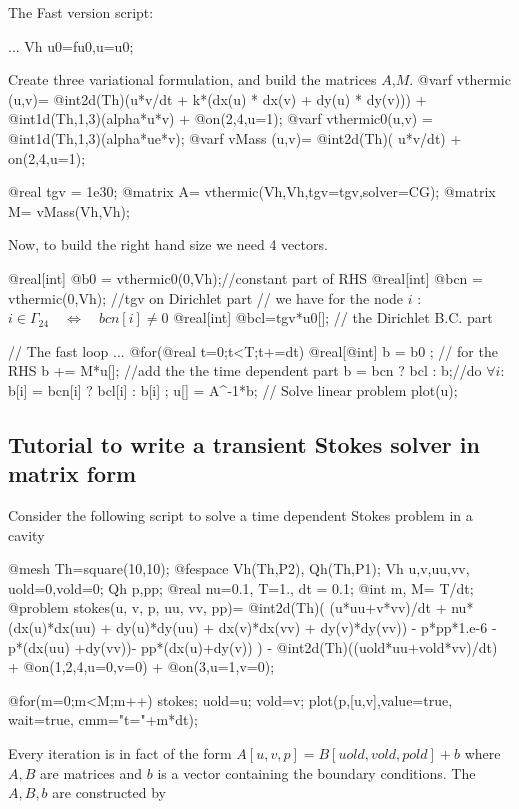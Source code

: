 \documentclass[a4paper,twoside,12pt]{book}
\begin{document}
The Fast version script:

\bFF
 ...
Vh u0=fu0,u=u0; 
\eFF

Create three variational formulation, and build the matrices $A$,$M$.\label{matrix-varf}
\bFF
@varf vthermic (u,v)= @int2d(Th)(u*v/dt 
           + k*(dx(u) * dx(v) + dy(u) * dy(v)))  
  +  @int1d(Th,1,3)(alpha*u*v)  + @on(2,4,u=1); 
@varf vthermic0(u,v) =   @int1d(Th,1,3)(alpha*ue*v);
@varf vMass (u,v)= @int2d(Th)( u*v/dt)  + on(2,4,u=1);

@real tgv = 1e30;
@matrix A= vthermic(Vh,Vh,tgv=tgv,solver=CG);
@matrix M= vMass(Vh,Vh);
\eFF


Now, to build the right hand size we need 4 vectors.

\bFF
@real[int]  @b0 = vthermic0(0,Vh);//constant part of  RHS 
@real[int]  @bcn = vthermic(0,Vh); //tgv on Dirichlet part  
// we have for the node $i$ : $i\in \Gamma_{24}  \quad \Leftrightarrow \quad bcn[i] \ne 0 $
@real[int]  @bcl=tgv*u0[]; //  the Dirichlet B.C. part 

// The fast loop ... 
@for(@real t=0;t<T;t+=dt){
  @real[@int] b = b0 ; // for the  RHS
  b += M*u[]; //add the the time dependent part
  b = bcn ? bcl : b;//do $\forall i$:  b[i] =  bcn[i] ? bcl[i] : b[i]  ;    
  u[] = A^-1*b;   //  Solve linear problem  
  plot(u);
}
\eFF 

\subsection{Tutorial to write a transient Stokes solver in matrix form}

Consider the following script to solve a time dependent Stokes problem in a cavity

\bFF
@mesh Th=square(10,10);
@fespace Vh(Th,P2), Qh(Th,P1);
Vh u,v,uu,vv, uold=0,vold=0;
Qh p,pp;
@real nu=0.1, T=1., dt = 0.1;
@int m, M= T/dt;
@problem stokes(u, v, p, uu, vv, pp)=
  @int2d(Th)(  (u*uu+v*vv)/dt + nu*(dx(u)*dx(uu) + dy(u)*dy(uu)
            	 + dx(v)*dx(vv) + dy(v)*dy(vv)) 
                 - p*pp*1.e-6   - p*(dx(uu) +dy(vv))- pp*(dx(u)+dy(v))
           	  ) - @int2d(Th)((uold*uu+vold*vv)/dt)
  		 		+ @on(1,2,4,u=0,v=0) + @on(3,u=1,v=0);

@for(m=0;m<M;m++){
	stokes; uold=u; vold=v;
}
plot(p,[u,v],value=true, wait=true, cmm="t="+m*dt);
\eFF

Every iteration is in fact of the form $ A[u,v,p] = B[uold,vold,pold] + b$ where $A,B$ are matrices and $b$ is a vector containing the boundary conditions.
The $A,B,b$ are constructed by
\end{document}
